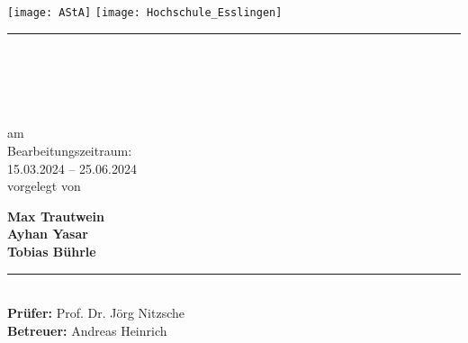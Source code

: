 \newcommand{\HRule}[2]{\noindent\rule[#1]{\linewidth}{#2}}
\newcommand{\vlinespace}[1]{\vspace*{#1\baselineskip}}
\newcommand{\titleemph}[1]{\textbf{#1}}
\begin{titlepage}
    \sffamily
    \texttt{[image: AStA]}
    \hfill
    \texttt{[image: Hochschule\_Esslingen]}
    \HRule{13pt}{1pt}
    \centering
    \vlinespace{3}\\
    \workTyp\\
    \begin{Large}
        \textbf{\workTitel}\\
    \end{Large}
    \vlinespace{4}
    am \workDatum\\
    \vlinespace{1}
    Bearbeitungszeitraum:\\
    15.03.2024 -- 25.06.2024\\
    \vlinespace{4}
    vorgelegt von\\
    \begin{Large}
        \textbf{Max Trautwein}\\
        \textbf{Ayhan Yasar}\\
        \textbf{Tobias Bührle}\\
    \end{Large}
    \vlinespace{1}
    \vfill
    \raggedright{}
    \HRule{13pt}{1pt} \\
    \titleemph{Prüfer:} Prof. Dr. Jörg Nitzsche\\
    \titleemph{Betreuer:} Andreas Heinrich\\
\end{titlepage}

